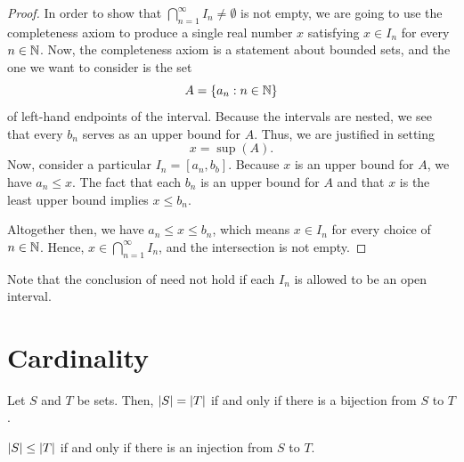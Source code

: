 \documentclass[11pt,twoside=off,numbers=noenddot]{scrbook}
\begin{document}
\begin{proof}
    In order to show that $\bigcap_{n = 1}^{\infty} I_n \neq \emptyset$ is not empty, we are going to use the completeness axiom to produce a single real number $x$ satisfying $x \in I_n$ for every $n \in \mathbb N$. Now, the completeness axiom is a statement about bounded sets, and the one we want to consider is the set
    \[ A = \{ a_n : n \in \mathbb N \} \]
    of left-hand endpoints of the interval. Because the intervals are nested, we see that every $b_n$ serves as an upper bound for $A$. Thus, we are justified in setting
    \[ x = \sup(A). \]
    Now, consider a particular $I_n = [a_n, b_b]$. Because $x$ is an upper bound for $A$, we have $a_n \leq x$. The fact that each $b_n$ is an upper bound for $A$ and that $x$ is the least upper bound implies $x \leq b_n$.

    Altogether then, we have $a_n \leq x \leq b_n$, which means $x \in I_n$ for every choice of $n \in \mathbb N$. Hence, $x \in \bigcap_{n = 1}^{\infty} I_n$, and the intersection is not empty.
\end{proof}

\begin{remark}
    Note that the conclusion of  need not hold if each $I_n$ is allowed to be an open interval.
\end{remark}

\chapter{Cardinality}
\begin{definition}[Cardinality]
    Let $S$ and $T$ be sets. Then, $| S | = | T |$ if and only if there is a bijection from $S$ to $T$.
\end{definition}

\begin{definition}
    $| S | \leq | T |$ if and only if there is an injection from $S$ to $T$.
\end{definition}
\end{document}
